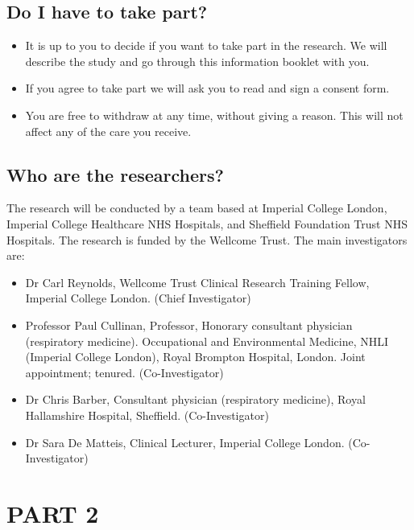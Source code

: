 \documentclass[a4paper,10pt]{article}
\begin{document}
\subsection*{Do I have to take part?}
\begin{itemize}
 \item It is up to you to decide if you want to take part in the research. We will describe the study and go through this information booklet with you.
 \item If you agree to take part we will ask you to read and sign a consent form.
 \item You are free to withdraw at any time, without giving a reason. This will not affect any of the care you receive.
\end{itemize}

 
\subsection*{Who are the researchers?}
The research will be conducted by a team based at Imperial College London, Imperial College Healthcare NHS Hospitals, and Sheffield Foundation Trust NHS Hospitals. The research is funded by the Wellcome Trust. The main investigators are:
\begin{itemize}
 \item Dr Carl Reynolds, Wellcome Trust Clinical Research Training Fellow, Imperial College London. (Chief Investigator)
 \item Professor Paul Cullinan, Professor, Honorary consultant physician (respiratory medicine). Occupational and Environmental Medicine, NHLI (Imperial College London), Royal Brompton Hospital, London.
Joint appointment; tenured. (Co-Investigator)
 \item Dr Chris Barber, Consultant physician (respiratory medicine), Royal Hallamshire Hospital, Sheffield. (Co-Investigator)
 \item Dr Sara De Matteis, Clinical Lecturer, Imperial College London. (Co-Investigator)
\end{itemize}

\section*{PART 2}
\end{document}
